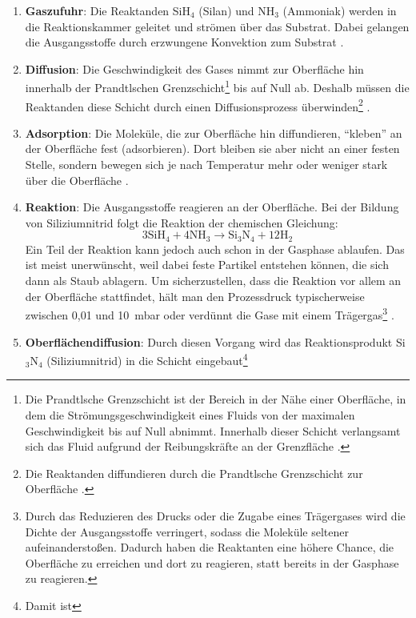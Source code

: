 \documentclass{article} %
\begin{document}
\begin{enumerate}
    \item \textbf{Gaszufuhr}: Die Reaktanden SiH$_4$ (Silan) und NH$_3$ (Ammoniak) werden in die Reaktionskammer geleitet und strömen über das Substrat. Dabei 
    gelangen die Ausgangsstoffe durch erzwungene Konvektion zum Substrat \cite{keplinger2024CVD}.
    \item \textbf{Diffusion}: Die Geschwindigkeit des Gases nimmt zur Oberfläche hin innerhalb der Prandtlschen Grenzschicht\footnote{Die Prandtlsche Grenzschicht 
    ist der Bereich in der Nähe einer Oberfläche, in dem die Strömungsgeschwindigkeit eines Fluids von der maximalen Geschwindigkeit bis auf Null abnimmt. 
    Innerhalb dieser Schicht verlangsamt sich das Fluid aufgrund der Reibungskräfte an der Grenzfläche \cite{white2006}.} bis auf Null ab. Deshalb müssen die 
    Reaktanden diese Schicht durch einen Diffusionsprozess überwinden\footnote{Die Reaktanden diffundieren durch die Prandtlsche Grenzschicht zur Oberfläche 
    \cite{bergman2011, incropera2007}.} \cite{keplinger2024CVD}.
    \item \textbf{Adsorption}: Die Moleküle, die zur Oberfläche hin diffundieren, ``kleben'' an der Oberfläche fest (adsorbieren). Dort bleiben sie aber nicht an 
    einer festen Stelle, sondern bewegen sich je nach Temperatur mehr oder weniger stark über die Oberfläche \cite{keplinger2024CVD, bergman2011, incropera2007}.
    \item \textbf{Reaktion}: Die Ausgangsstoffe reagieren an der Oberfläche. Bei der Bildung von Siliziumnitrid folgt die Reaktion der chemischen Gleichung:
    $$
    3\mathrm{SiH}_4 + 4\mathrm{NH}_3 \rightarrow \mathrm{Si}_3\mathrm{N}_4 + 12\mathrm{H}_2
    $$
    Ein Teil der Reaktion kann jedoch auch schon in der Gasphase ablaufen. Das ist meist unerwünscht, weil dabei feste Partikel entstehen können, die sich dann als 
    Staub ablagern. Um sicherzustellen, dass die Reaktion vor allem an der Oberfläche stattfindet, hält man den Prozessdruck typischerweise zwischen 0,01 und 
    10~mbar oder verdünnt die Gase mit einem Trägergas\footnote{Durch das Reduzieren des Drucks oder die Zugabe eines Trägergases wird die Dichte der 
    Ausgangsstoffe verringert, sodass die Moleküle seltener aufeinanderstoßen. Dadurch haben die Reaktanten eine höhere Chance, die Oberfläche zu erreichen und
     dort zu reagieren, statt bereits in der Gasphase zu reagieren.} \cite{keplinger2024CVD}.
    \item \textbf{Oberflächendiﬀusion}: Durch diesen Vorgang wird das Reaktionsprodukt Si$_3$N$_4$ (Siliziumnitrid) in die Schicht eingebaut\footnote{Damit ist 
}
\end{enumerate}
\end{document}
